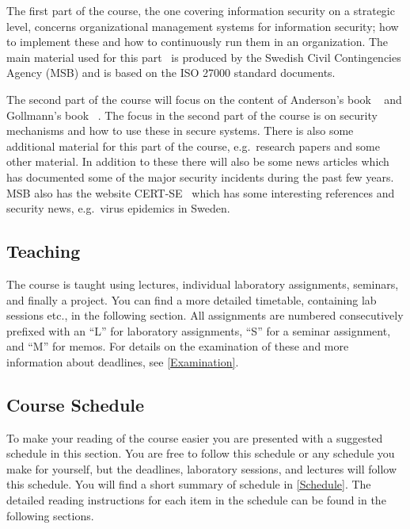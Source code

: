 \documentclass[a4paper]{llncs}
\begin{document}
The first part of the course, the one covering information security on 
a strategic level, concerns organizational management systems for information 
security; how to implement these and how to continuously run them in an 
organization.
The main material used for this part~\cite{%
  MSB2011itm,MSB2011sle,MSB2011p,%
	MSB2011v,MSB2011r,MSB2011gap,MSB2011gb,%
	MSB2011vs,MSB2011us,MSB2011upo,%
	MSB2011pg,MSB2011koa,MSB2011i,%
	MSB2011o,MSB2011g,MSB2011lg,%
	MSB2011ulo,MSB2011kf,MSB2011fa%
} is produced by the Swedish Civil Contingencies Agency (MSB) and is based on 
the ISO 27000 standard documents.

The second part of the course will focus on the content of Anderson's book 
~\cite{Anderson2008sea} and Gollmann's book 
~\cite{Gollmann2011cs}.
The focus in the second part of the course is on security mechanisms and how to 
use these in secure systems.
There is also some additional material for this part of the course, 
e.g.~research papers and some other material.
In addition to these there will also be some news articles which has documented 
some of the major security incidents during the past few years.
MSB also has the website CERT-SE~\cite{CERT-SE} which has some interesting 
references and security news, e.g.~virus epidemics in Sweden.

\subsection{Teaching}

The course is taught using lectures, individual laboratory assignments, 
seminars, and finally a project.
You can find a more detailed timetable, containing lab sessions etc., in the 
following section.
All assignments are numbered consecutively prefixed with an \enquote{L} for 
laboratory assignments, \enquote{S} for a seminar assignment, and \enquote{M} 
for memos.
For details on the examination of these and more information about deadlines, 
see \cref{Examination}.

\subsection{Course Schedule}
\label{sec:schedule}
To make your reading of the course easier you are presented with a suggested 
schedule in this section.
You are free to follow this schedule or any schedule you make for yourself, but 
the deadlines, laboratory sessions, and lectures will follow this schedule.
You will find a short summary of schedule in \cref{Schedule}.
The detailed reading instructions for each item in the schedule can be found in 
the following sections.
\end{document}
